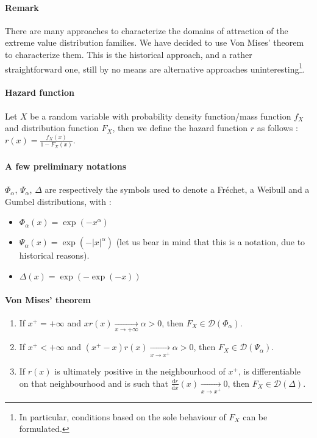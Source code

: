 \paragraph{Remark} There are many approaches to characterize the domains of attraction of the extreme value distribution families. We have decided to use Von Mises' theorem to characterize them. This is the historical approach, and a rather straightforward one, still by no means are alternative approaches uninteresting\footnote{In particular, conditions based on the sole behaviour of $F_X$ can be formulated.}.
\paragraph{Hazard function} Let $X$ be a random variable with probability density function/mass function $f_X$ and distribution function $F_X$, then we define the hazard function $r$ as follows : \newline
$r(x) = \frac{f_X(x)}{1 - F_X(x)}$.
\paragraph{A few preliminary notations} $\Phi_\alpha$, $\Psi_\alpha$, $\Delta$ are respectively the symbols used to denote a Fréchet, a Weibull and a Gumbel distributions, with :
\begin{itemize}
	\item $\Phi_\alpha(x) = \exp(- x^\alpha)$
	\item $\Psi_\alpha(x) = \exp(-  \lvert x \rvert^\alpha)$ (let us bear in mind that this is a notation, due to historical reasons).
	\item $\Delta(x) = \exp(- \exp(- x))$
\end{itemize}
\paragraph{Von Mises' theorem}
\begin{enumerate}
	\item If $x^+ = + \infty$ and $x r(x) \xrightarrow[x \rightarrow + \infty]{} \alpha > 0$, then $F_X \in \mathcal{D}(\Phi_\alpha)$.
	\item If $x^+ < + \infty$ and $(x^+ - x) r(x) \xrightarrow[x \rightarrow x^+]{} \alpha > 0$, then $F_X \in \mathcal{D}(\Psi_\alpha)$.
	\item If $r(x)$ is ultimately positive in the neighbourhood of $x^+$, is differentiable on that neighbourhood and is such that $\frac{\mathrm{d}r}{\mathrm{d}x}(x) \xrightarrow[x \rightarrow x^+]{} 0$, then $F_X \in \mathcal{D}(\Delta)$.
\end{enumerate}
